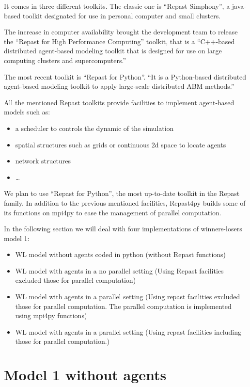 \documentclass{article}
\providecommand{\tightlist}{%
  \setlength{\itemsep}{0pt}\setlength{\parskip}{0pt}}
\begin{document}
It comes in three different toolkits. 
The classic one is ``Repast Simphony'', a java-based toolkit designated for use in personal computer and small clusters.  

The increase in computer availability brought the development team to release the ``Repast for High Performance Computing'' toolkit, that is a ``C++-based distributed agent-based modeling toolkit that is designed for use on large computing clusters and supercomputers.'' 

The most recent toolkit is ``Repast for Python''. ``It is a Python-based distributed agent-based modeling toolkit to apply large-scale distributed ABM methods.'' 

All the mentioned Repast toolkits provide facilities to implement agent-based models such as:
\begin{itemize}
\tightlist
	\item a scheduler to controls the dynamic of the simulation
	\item spatial structures such as grids or continuous 2d space to locate agents
	\item network structures
	\item \ldots
\end{itemize}

We plan to use ``Repast for Python'', the most up-to-date toolkit in the Repast family. In addition to the previous mentioned facilities, Repast4py builds some of its functions on mpi4py to ease the management of parallel computation.

In the following section we will deal with four implementations of winners-losers model 1:
\begin{itemize}
	\item WL model without agents coded in python (without Repast functions)
	\item WL model with agents in a no parallel setting (Using Repast facilities excluded those for parallel computation)
	\item WL model with agents in a parallel setting (Using repast facilities excluded those for parallel computation. The parallel computation is implemented using mpi4py functions)
	\item WL model with agents in a parallel setting (Using repast facilities including those for parallel computation.)
\end{itemize}

\section{Model 1 without agents}\label{sec:model1withoutagents}
\end{document}
